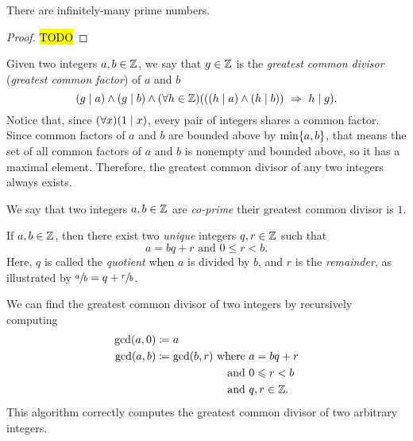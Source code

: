 \begin{theorem}
    There are infinitely-many prime numbers.
\end{theorem}
\begin{proof}
    \hl{TODO}
\end{proof}

\begin{definition}
    Given two integers $a, b \in \mathbb{Z}$,
    we say that $g \in \mathbb{Z}$ is the \emph{greatest common divisor}
    (\aka \emph{greatest common factor})
    of $a$ and $b$ \iffbydefn
    \[
        \pn*{g \div a} \meet \pn*{g \div b} \meet
        \pn*{\forall h \in \Z}\pn*{\pn*{\pn*{h \div a} \meet \pn*{h \div b}} \implies h \div g}.
    \]
    Notice that, since $\pn*{\forall x}\pn*{1 \div x}$,
    every pair of integers shares a common factor.
    Since common factors of $a$ and $b$ are bounded above by $\min\set*{a, b}$,
    that means the set of all common factors of $a$ and $b$ is nonempty and bounded above,
    so it has a maximal element.
    Therefore, the greatest common divisor of any two integers always exists.
\end{definition}

\begin{definition}[Co-Primality]
    We say that two integers $a, b \in \mathbb{Z}$ are \emph{co-prime} \iffbydefn 
    their greatest common divisor is $1$.
\end{definition}

\begin{theorem}
    If $a, b \in \mathbb{Z}$, then there exist two \emph{unique} integers $q, r \in \mathbb{Z}$ such that
    \[
        a = bq + r
        \text{ and } 0 \leq r < b.
    \]
    Here, $q$ is called the \emph{quotient} when $a$ is divided by $b$,
    and $r$ is the \emph{remainder}, as illustrated by
    $\sfrac{a}{b} = q + \sfrac{r}{b}$.
\end{theorem}

\begin{algorithm}\label{alg:division}
    We can find the greatest common divisor of two integers by recursively computing
    \begin{align*}
        \gcd\pn*{a, 0} &\defn a \\
        \gcd\pn*{a, b} &\defn \gcd\pn*{b, r}
        \begin{aligned}[t]
            \text{ where } &a = bq + r\\
            \text{ and } &0 \leq r < b\\
            \text{ and } &q, r \in \Z.
        \end{aligned}
    \end{align*}
    This algorithm correctly computes the greatest common divisor of two arbitrary integers.
\end{algorithm}


